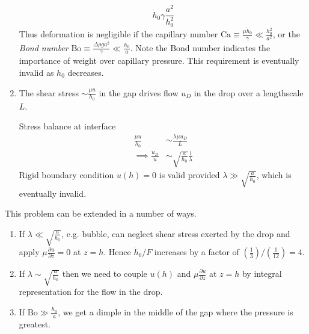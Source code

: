 \documentclass{jknotes}
\begin{document}
\begin{eg}
\begin{enumerate}
\begin{equation}
{				\dot{h}_0}{\gamma} \frac{a^2}{h_0^2}
			\end{equation}
			Thus deformation is negligible if the capillary number $\text{Ca}
			\equiv \frac{\mu \dot{h}_0}{\gamma} \ll \frac{h_0^2}{a^2}$, or the
			\emph{Bond number} $\text{Bo} \equiv \frac{\Delta \rho g
			a^2}{\gamma} \ll \frac{h_0}{a}$. Note the Bond number indicates
			the importance of weight over capillary pressure. This requirement
			is eventually invalid as $h_0$ decreases.
		\item The shear stress $\sim \frac{\mu u}{h_0}$ in the gap drives flow
			$u_D$ in the drop over a lengthscale $L$.
			\begin{center}
			\end{center}
			Stress balance at interface
			\begin{align}
				\frac{\mu u}{h_0} &\sim \frac{\lambda \mu u_D}{L} \\
				\implies \frac{u_D}{u} &\sim \sqrt{\frac{a}{h_0}}
				\frac{1}{\lambda}
			\end{align}
			Rigid boundary condition $u(h) = 0$ is valid provided $\lambda \gg
			\sqrt{\frac{a}{h_0}}$, which is eventually invalid.
	\end{enumerate}

	This problem can be extended in a number of ways.
	\begin{enumerate}
		\item If $\lambda \ll \sqrt{\frac{a}{h_0}}$, e.g. bubble, can neglect
			shear stress exerted by the drop and apply $\mu \frac{\partial
			u}{\partial z} = 0$ at $z=h$. Hence $\dot{h}_0/F$ increases by a
			factor of $(\frac{1}{3})/(\frac{1}{12}) = 4$. 
		\item If $\lambda \sim \sqrt{\frac{a}{h_0}}$ then we need to couple
			$u(h)$ and $\mu \frac{\partial u}{\partial z}$ at $z=h$ by
			integral representation for the flow in the drop.
		\item If $\text{Bo} \gg \frac{h_0}{a}$, we get a dimple in the middle
			of the gap where the pressure is greatest.
	\end{enumerate}
\end{eg}
\end{document}
